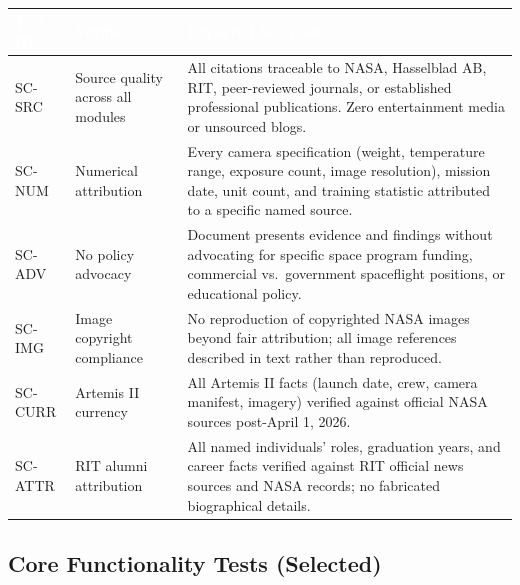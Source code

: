 \documentclass[11pt,letterpaper]{article}
\newcommand{\tableheader}[1]{\textbf{\sffamily\textcolor{white}{#1}}}
\begin{document}
\begin{center}
\begin{tabularx}{\textwidth}{L{1.5cm}L{4.5cm}X}
\toprule
{}
\tableheader{Test ID} & \tableheader{Verifies} & \tableheader{Expected Behavior} \\
\midrule
SC-SRC & Source quality across all modules & All citations traceable to NASA, Hasselblad AB, RIT, peer-reviewed journals, or established professional publications. Zero entertainment media or unsourced blogs. \\
SC-NUM & Numerical attribution & Every camera specification (weight, temperature range, exposure count, image resolution), mission date, unit count, and training statistic attributed to a specific named source. \\
SC-ADV & No policy advocacy & Document presents evidence and findings without advocating for specific space program funding, commercial vs.\ government spaceflight positions, or educational policy. \\
SC-IMG & Image copyright compliance & No reproduction of copyrighted NASA images beyond fair attribution; all image references described in text rather than reproduced. \\
SC-CURR & Artemis II currency & All Artemis II facts (launch date, crew, camera manifest, imagery) verified against official NASA sources post-April 1, 2026. \\
SC-ATTR & RIT alumni attribution & All named individuals' roles, graduation years, and career facts verified against RIT official news sources and NASA records; no fabricated biographical details. \\
\bottomrule
\end{tabularx}
\end{center}

\subsection{Core Functionality Tests (Selected)}
\end{document}
